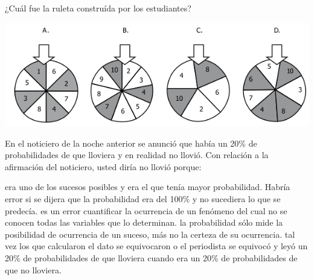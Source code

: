 \documentclass[10pt,letterpaper,addpoints]{exam}
\begin{document}
\begin{questions}
¿Cuál fue la ruleta construída por los estudiantes?
\begin{center}
\includegraphics[scale=.75]{Images/ruletas.png}
\end{center}
\question En el noticiero de la noche anterior se anunció que había un 20\% de probabilidades de que lloviera y en realidad no llovió. Con relación a la afirmación del noticiero, usted diría no llovió porque:
\begin{choices}
\choice era uno de los sucesos posibles y era el que tenía mayor probabilidad. Habría error si se dijera que la probabilidad era del 100\% y no sucediera lo que se predecía.
\choice es un error cuantificar la ocurrencia de un fenómeno del cual no se conocen todas las variables que lo determinan.
\CorrectChoice la probabilidad sólo mide la posibilidad de ocurrencia de un suceso, más no la certeza de su ocurrencia.
\choice tal vez los que calcularon el dato se equivocaron o el periodista se equivocó y leyó un 20\% de probabilidades de que lloviera cuando era un 20\% de probabilidades de que no lloviera.
\end{choices}

\end{questions}
\end{document}
